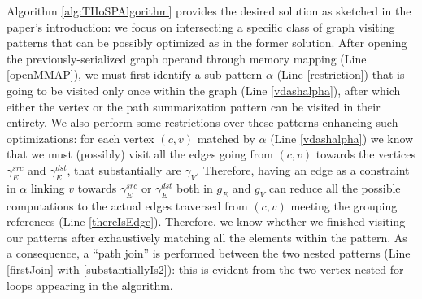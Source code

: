 Algorithm \ref{alg:THoSPAlgorithm} provides the desired solution as sketched in the paper's introduction: we focus on intersecting a specific class of graph visiting patterns that can be possibly optimized as in the former solution. 
 After opening the previously-serialized graph operand through memory mapping (Line \ref{openMMAP}), we must first identify a sub-pattern $\alpha$ (Line \ref{restriction}) that is going to be visited only once within the graph (Line \ref{vdashalpha}), after which either the vertex or the path summarization pattern can be visited in their entirety. We also perform some restrictions over these patterns enhancing such optimizations: for each vertex $(c,v)$ matched by $\alpha$ (Line \ref{vdashalpha}) we know that we must (possibly) visit all the edges going from $(c,v)$ towards the vertices $\gamma_E^{src}$ and $\gamma_E^{dst}$, that substantially are $\gamma_V$.  Therefore, having an edge as a constraint in $\alpha$ linking $v$ towards $\gamma_E^{src}$ or $\gamma_E^{dst}$ both in $g_E$ and $g_V$ can reduce all the possible computations to the actual edges traversed from $(c,v)$ meeting the grouping references (Line \ref{thereIsEdge}). Therefore, we know whether we finished visiting our patterns after exhaustively matching all the elements within the pattern.
As a consequence, a ``path join'' is performed between the two nested patterns (Line \ref{firstJoin} with \ref{substantiallyIs2}): this is evident from the two vertex nested for loops appearing in the algorithm.  %




